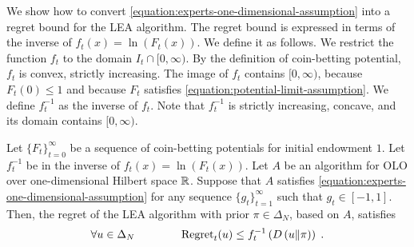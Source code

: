 We show how to convert \eqref{equation:experts-one-dimensional-assumption} into
a regret bound for the LEA algorithm. The regret bound is expressed in terms of
the inverse of $f_t(x) = \ln(F_t(x))$. We define it as follows. We restrict the
function $f_t$ to the domain $I_t \cap [0, \infty)$. By the definition of
coin-betting potential, $f_t$ is convex, strictly increasing. The image of $f_t$
contains $[0,\infty)$, because $F_t(0) \le 1$ and because $F_t$ satisfies
\eqref{equation:potential-limit-assumption}. We define $f_t^{-1}$ as the inverse
of $f_t$. Note that $f_t^{-1}$ is strictly increasing, concave, and its domain
contains $[0, \infty)$.

\begin{theorem}
\label{theorem:regret-bound-experts}
Let $\{F_t\}_{t=0}^\infty$ be a sequence of coin-betting potentials for initial
endowment $1$. Let $f_t^{-1}$ be in the inverse of $f_t(x) = \ln(F_t(x))$.
Let $A$ be an algorithm for OLO over one-dimensional Hilbert space
$\mathbb{R}$. Suppose that $A$ satisfies
\eqref{equation:experts-one-dimensional-assumption} for any sequence
$\{g_t\}_{t=1}^\infty$ such that $g_t \in [-1,1]$. Then, the regret of the
LEA algorithm with prior $\pi \in \Delta_N$, based on $A$, satisfies
$$
\forall u \in \Delta_N \qquad \qquad
\operatorname{Regret}_t(u) \le f_t^{-1}\left( D\left({u}\middle\|{\pi}\right) \right) \; .
$$
\end{theorem}

